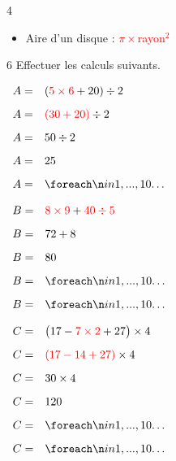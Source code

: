 \documentclass[a4paper]{book}
\begin{document}
{\begin{exerciceNote}{4}
\begin{enumerate}[leftmargin=*]
\begin{minipage}{0.49\linewidth}
\begin{itemize}
                    \medskip 
                    
                    \item Aire d'un disque : \textcolor{red}{$\pi\times$rayon$^2$}
                \end{itemize}
            \end{minipage}

        \end{enumerate}
    \end{exerciceNote}


    \begin{exerciceNote}{6}
        Effectuer les calculs suivants.
   
        \begin{minipage}{0.3\linewidth}
            $\begin{array}{ll}
                A = & (\textcolor{red}{5\times6}+20)\div2 \\[2ex]
                A = & \textcolor{red}{(30+20)}\div 2 \\[2ex]
                A = & 50\div 2 \\[2ex]
                A = & 25 \\[2ex]
                A = & \points[10]
            \end{array}$

            \bigskip

            $\begin{array}{ll}
                B = & \textcolor{red}{8\times9} + \textcolor{red}{40\div5} \\[2ex]
                B = & 72+8\\[2ex]
                B = & 80\\[2ex]
                B = & \points[10]\\[2ex]
                B = & \points[10]
            \end{array}$  
        \end{minipage}
        \vline
        \begin{minipage}{0.35\linewidth}
            $\begin{array}{ll}
                C = & \big(17-\textcolor{red}{7\times2}+27\big)\times4 \\[2ex]
                C = & \textcolor{red}{(17-14+27)}\times4\\[2ex]
                C = & 30\times4\\[2ex]
                C = & 120\\[2ex]
                C = & \points[10]\\[2ex]
                C = & \points[10]
            \end{array}$


\end{minipage}
\end{exerciceNote}}
\end{document}
